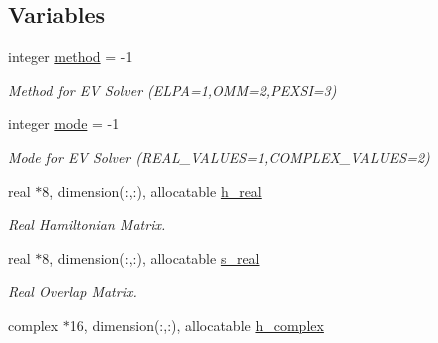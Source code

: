 \subsection*{Variables}
\begin{DoxyCompactItemize}
\item 
\hypertarget{namespaceelsi_abb4e04a2d624f8d169abb6dd55f8510c}{}integer \hyperlink{namespaceelsi_abb4e04a2d624f8d169abb6dd55f8510c}{method} = -\/1\label{namespaceelsi_abb4e04a2d624f8d169abb6dd55f8510c}

\begin{DoxyCompactList}\small\item\em Method for E\+V Solver (E\+L\+P\+A=1,O\+M\+M=2,P\+E\+X\+S\+I=3) \end{DoxyCompactList}\item 
\hypertarget{namespaceelsi_ac6c03b44a7776b204d99901393c46f64}{}integer \hyperlink{namespaceelsi_ac6c03b44a7776b204d99901393c46f64}{mode} = -\/1\label{namespaceelsi_ac6c03b44a7776b204d99901393c46f64}

\begin{DoxyCompactList}\small\item\em Mode for E\+V Solver (R\+E\+A\+L\+\_\+\+V\+A\+L\+U\+E\+S=1,C\+O\+M\+P\+L\+E\+X\+\_\+\+V\+A\+L\+U\+E\+S=2) \end{DoxyCompactList}\item 
\hypertarget{namespaceelsi_acad05692ff6524b60681edbdd3158ea5}{}real $\ast$8, dimension(\+:,\+:), allocatable \hyperlink{namespaceelsi_acad05692ff6524b60681edbdd3158ea5}{h\+\_\+real}\label{namespaceelsi_acad05692ff6524b60681edbdd3158ea5}

\begin{DoxyCompactList}\small\item\em Real Hamiltonian Matrix. \end{DoxyCompactList}\item 
\hypertarget{namespaceelsi_a43a651d3d4b28520de575e3da8b916b4}{}real $\ast$8, dimension(\+:,\+:), allocatable \hyperlink{namespaceelsi_a43a651d3d4b28520de575e3da8b916b4}{s\+\_\+real}\label{namespaceelsi_a43a651d3d4b28520de575e3da8b916b4}

\begin{DoxyCompactList}\small\item\em Real Overlap Matrix. \end{DoxyCompactList}\item 
\hypertarget{namespaceelsi_aa4d56f9a13f6b349a97188b4ba0894a8}{}complex $\ast$16, dimension(\+:,\+:), allocatable \hyperlink{namespaceelsi_aa4d56f9a13f6b349a97188b4ba0894a8}{h\+\_\+complex}\label{namespaceelsi_aa4d56f9a13f6b349a97188b4ba0894a8}


\end{DoxyCompactItemize}
